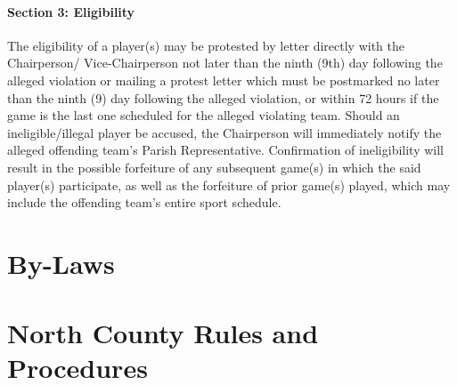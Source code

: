 \documentclass[10pt,oneside,draft]{memoir}
\begin{document}
\subsection{Section 3: Eligibility}
The eligibility of a player(s) may be protested by letter directly with the Chairperson/ Vice-Chairperson not later than the ninth (9th) day following the alleged violation or mailing a protest letter which must be postmarked no later than the ninth (9) day following the alleged violation, or within 72 hours if the game is the last one scheduled for the alleged violating team.  Should an ineligible/illegal player be accused, the Chairperson will immediately notify the alleged offending team’s Parish Representative. Confirmation of ineligibility will result in the possible forfeiture of any subsequent game(s) in which the said player(s) participate, as well as the forfeiture of prior game(s) played, which may include the offending team’s entire sport schedule.

\newpage
\part{By-Laws}

\newpage
\part{North County Rules and Procedures}
\backmatter
\end{document}
